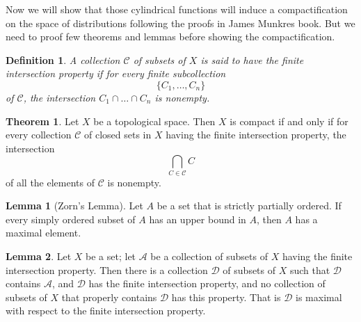 \documentclass{article}
\newtheorem{definition}{Definition}[subsection]
\theoremstyle{definition}
\newtheorem{lemma}{Lemma}
\newtheorem{theorem}{Theorem}
\begin{document}
Now we will show that those cylindrical functions will induce a compactification on the space of distributions following the proofs in James Munkres book.
But we need to proof few theorems and lemmas before showing the compactification. 
\begin{definition}
    A collection $\mathcal{C}$ of subsets of $X$ is said to have the finite intersection property if for every finite subcollection\[
    \{C_1, \ldots, C_n\}
    \] of $\mathcal{C}$, the intersection $C_1 \cap \ldots \cap C_n$ is nonempty.
\end{definition}
\begin{theorem}
Let $X$ be a topological space. Then $X$ is compact if and only if for every collection $\mathcal{C}$ of closed sets in $X$ having the finite intersection property, the intersection $$ \bigcap_{C \in \mathcal{C}} C
$$
of all the elements of $\mathcal{C}$ is nonempty.
\end{theorem}
\begin{lemma}[Zorn's Lemma]
Let $A$ be a set that is strictly partially ordered. If every simply ordered subset of $A$ has an upper bound in $A$, then $A$ has a maximal element.
\end{lemma}
\begin{lemma}
Let $X$ be a set; let $\mathcal{A}$ be a collection of subsets of $X$ having the finite intersection property. Then there is a collection $\mathscr{D}$ of subsets of $X$ such that $\mathscr{D}$ contains $\mathcal{A}$, and $\mathscr{D}$ has the finite intersection property, and no collection of subsets of $X$ that properly contains $\mathscr{D}$ has this property. That is $\mathscr{D}$ is maximal with respect to the finite intersection property.


\end{lemma}
\end{document}
